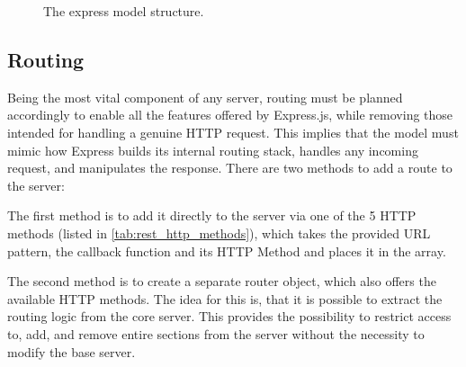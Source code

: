 \begin{figure}[h]
\begin{adjustbox}{width=\textwidth}
    \end{adjustbox}
    \caption{The express model structure.}
    \label{fig:express-struc}
\end{figure}


\subsection{Routing} 
\label{sec:routing}
Being the most vital component of any server, routing must be planned accordingly to enable all the features offered by Express.js, while removing those intended for handling a genuine HTTP request. This implies that the model must mimic how Express builds its internal routing stack, handles any incoming request, and manipulates the response. There are two methods to add a route to the server:

The first method is to add it directly to the server via one of the 5 HTTP methods (listed in \autoref{tab:rest_http_methods}), which takes the provided URL pattern, the callback function and its HTTP Method and places it in the array.

The second method is to create a separate router object, which also offers the available HTTP methods. The idea for this is, that it is possible to extract the routing logic from the core server. This provides the possibility to restrict access to, add, and remove entire sections from the server without the necessity to modify the base server.

